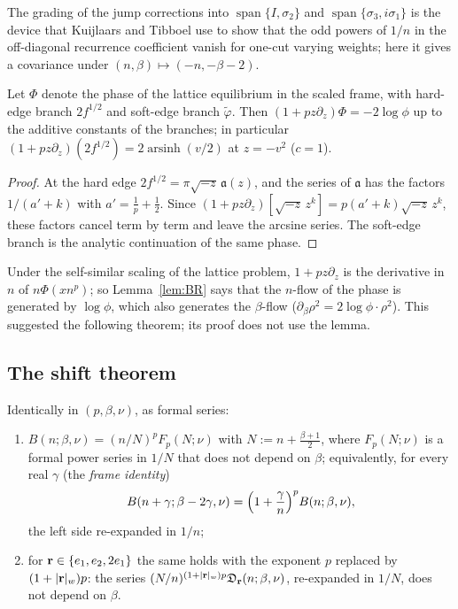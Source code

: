 The grading of the jump corrections into $\operatorname{span}\{I,\sigma_2\}$ and $\operatorname{span}\{\sigma_3,i\sigma_1\}$ is the device
that Kuijlaars and Tibboel \cite[Lemma~4.1]{KuijlaarsTibboel} use to show that the odd powers of $1/n$ in the off-diagonal recurrence
coefficient vanish for one-cut varying weights; here it gives a covariance under $(n,\beta)\mapsto(-n,-\beta-2)$.

\begin{lemma}\label{lem:BR}
Let $\Phi$ denote the phase of the lattice equilibrium in the scaled frame, with hard-edge branch $2f^{1/2}$ and soft-edge
branch $\tilde\varphi$. Then $(1+pz\partial_z)\Phi=-2\log\phi$ up to the additive constants of the branches; in particular
$(1+pz\partial_z)(2f^{1/2})=2\operatorname{arsinh}(v/2)$ at $z=-v^2$ ($c=1$).
\end{lemma}

\begin{proof}
At the hard edge $2f^{1/2}=\pi\sqrt{-z}\,\mathfrak a(z)$, and the series of $\mathfrak a$ has the factors $1/(a'+k)$ with
$a'=\frac1p+\frac12$. Since $(1+pz\partial_z)[\sqrt{-z}\,z^k]=p(a'+k)\sqrt{-z}\,z^k$, these factors cancel term by term and
leave the arcsine series. The soft-edge branch is the analytic continuation of the same phase.
\end{proof}

Under the self-similar scaling of the lattice problem, $1+pz\partial_z$ is the derivative in $n$ of $n\Phi(xn^p)$; so
Lemma~\ref{lem:BR} says that the $n$-flow of the phase is generated by $\log\phi$, which also generates the $\beta$-flow
($\partial_\beta\rho^2=2\log\phi\cdot\rho^2$). This suggested the following theorem; its proof does not use the lemma.

\subsection{The shift theorem}\label{sec:shift-thm}
\begin{theorem}[shift]\label{thm:shift}
Identically in $(p,\beta,\nu)$, as formal series:
\begin{enumerate}
\item[(i)] $B(n;\beta,\nu)=(n/N)^pF_p(N;\nu)$ with $N:=n+\frac{\beta+1}2$, where $F_p(N;\nu)$ is a formal power series in $1/N$
that does not depend on $\beta$; equivalently, for every real $\gamma$ (the \emph{frame identity})
\begin{equation}\label{eq:FI}
  B(n+\gamma;\beta-2\gamma,\nu)=\Bigl(1+\frac\gamma n\Bigr)^pB(n;\beta,\nu),
\end{equation}
the left side re-expanded in $1/n$;
\item[(ii)] for $\mathbf r\in\{e_1,e_2,2e_1\}$ the same holds with the exponent $p$ replaced by $(1+|\mathbf r|_w)p$: the series
$(N/n)^{(1+|\mathbf r|_w)p}\mathfrak D_{\mathbf r}(n;\beta,\nu)$, re-expanded in $1/N$, does not depend on $\beta$.
\end{enumerate}
\end{theorem}


